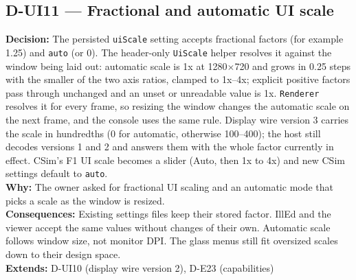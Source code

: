 \subsection*{D-UI11 --- Fractional and automatic UI scale}
\begin{decisionbox}[title={D-UI11 \quad 2026-09-25}]
\textbf{Decision:} The persisted \texttt{uiScale} setting accepts fractional
factors (for example 1.25) and \texttt{auto} (or 0). The header-only
\texttt{UiScale} helper resolves it against the window being laid out:
automatic scale is 1x at 1280$\times$720 and grows in 0.25 steps with the
smaller of the two axis ratios, clamped to 1x--4x; explicit positive factors
pass through unchanged and an unset or unreadable value is 1x.
\texttt{Renderer} resolves it for every frame, so resizing the window changes
the automatic scale on the next frame, and the console uses the same rule.
Display wire version 3 carries the scale in hundredths (0 for automatic,
otherwise 100--400); the host still decodes versions 1 and 2 and answers
them with the whole factor currently in effect. CSim's F1 UI scale becomes a
slider (Auto, then 1x to 4x) and new CSim settings default to
\texttt{auto}.\\
\textbf{Why:} The owner asked for fractional UI scaling and an automatic mode
that picks a scale as the window is resized.\\
\textbf{Consequences:} Existing settings files keep their stored factor.
IllEd and the viewer accept the same values without changes of their own.
Automatic scale follows window size, not monitor DPI. The glass menus still
fit oversized scales down to their design space.\\
\textbf{Extends:} D-UI10 (display wire version 2), D-E23 (capabilities)
\end{decisionbox}

